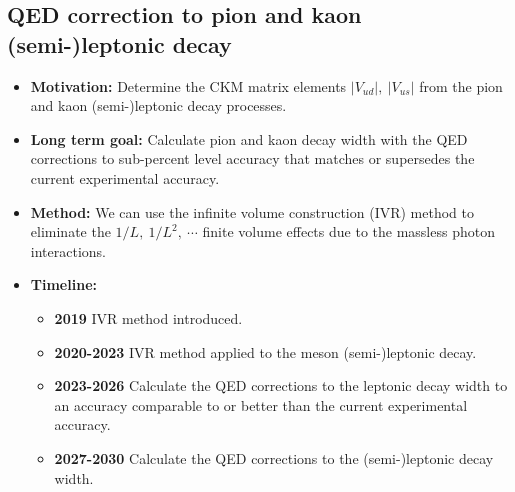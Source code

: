 \documentclass[12pt,hyperpdf]{article}
\begin{document}
\subsection{QED correction to pion and kaon (semi-)leptonic decay}
\begin{itemize}
    \item{\bf Motivation:} Determine the CKM matrix elements $|V_{ud}|,~|V_{us}|$ from the pion and kaon (semi-)leptonic decay processes.
    \item{\bf Long term goal:} Calculate pion and kaon decay width with the QED corrections to sub-percent level accuracy that matches or supersedes the current experimental accuracy.
    \item{\bf Method:}
      We can use the infinite volume construction (IVR) method \cite{Christ:2023lcc} to eliminate
      the $1/L,~1/L^2,~\cdots$ finite volume effects due to the massless photon interactions.
\item{\bf Timeline:}
\begin{itemize}
    \item{\bf 2019} IVR method introduced.
    \item{\bf 2020-2023} IVR method applied to the meson (semi-)leptonic decay.
    \item{\bf 2023-2026} Calculate the QED corrections to the leptonic decay width to an accuracy comparable to or better than the current experimental accuracy.
    \item{\bf 2027-2030} Calculate the QED corrections to the (semi-)leptonic decay width.
\end{itemize}
\end{itemize}


\end{document}
